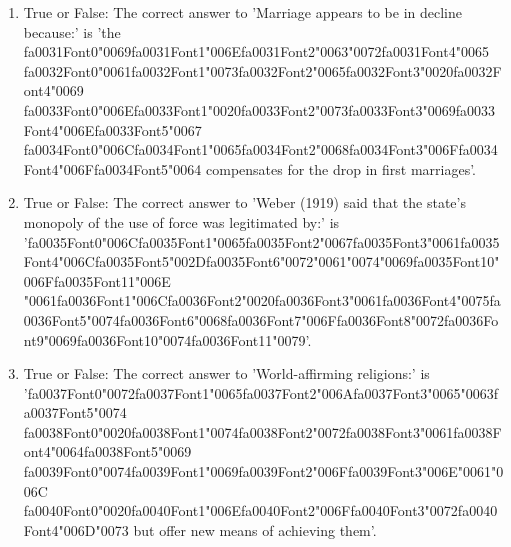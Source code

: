 \documentclass[12pt]{article}
\begin{document}
\begin{enumerate}[label=\arabic*.]
\item True or False: The correct answer to 'Marriage appears to be in decline because:' is 'the {\csname fa0031Font0\endcsname\char"0069}{\csname fa0031Font1\endcsname\char"006E}{\csname fa0031Font2\endcsname\char"0063}{\char"0072}{\csname fa0031Font4\endcsname\char"0065} {\csname fa0032Font0\endcsname\char"0061}{\csname fa0032Font1\endcsname\char"0073}{\csname fa0032Font2\endcsname\char"0065}{\csname fa0032Font3\endcsname\char"0020}{\csname fa0032Font4\endcsname\char"0069} {\csname fa0033Font0\endcsname\char"006E}{\csname fa0033Font1\endcsname\char"0020}{\csname fa0033Font2\endcsname\char"0073}{\csname fa0033Font3\endcsname\char"0069}{\csname fa0033Font4\endcsname\char"006E}{\csname fa0033Font5\endcsname\char"0067} {\csname fa0034Font0\endcsname\char"006C}{\csname fa0034Font1\endcsname\char"0065}{\csname fa0034Font2\endcsname\char"0068}{\csname fa0034Font3\endcsname\char"006F}{\csname fa0034Font4\endcsname\char"006F}{\csname fa0034Font5\endcsname\char"0064} compensates for the drop in first marriages'.
\item True or False: The correct answer to 'Weber (1919) said that the state's monopoly of the use of force was legitimated by:' is '{\csname fa0035Font0\endcsname\char"006C}{\csname fa0035Font1\endcsname\char"0065}{\csname fa0035Font2\endcsname\char"0067}{\csname fa0035Font3\endcsname\char"0061}{\csname fa0035Font4\endcsname\char"006C}{\csname fa0035Font5\endcsname\char"002D}{\csname fa0035Font6\endcsname\char"0072}{\char"0061}{\char"0074}{\char"0069}{\csname fa0035Font10\endcsname\char"006F}{\csname fa0035Font11\endcsname\char"006E} {\char"0061}{\csname fa0036Font1\endcsname\char"006C}{\csname fa0036Font2\endcsname\char"0020}{\csname fa0036Font3\endcsname\char"0061}{\csname fa0036Font4\endcsname\char"0075}{\csname fa0036Font5\endcsname\char"0074}{\csname fa0036Font6\endcsname\char"0068}{\csname fa0036Font7\endcsname\char"006F}{\csname fa0036Font8\endcsname\char"0072}{\csname fa0036Font9\endcsname\char"0069}{\csname fa0036Font10\endcsname\char"0074}{\csname fa0036Font11\endcsname\char"0079}'.
\item True or False: The correct answer to 'World-affirming religions:' is '{\csname fa0037Font0\endcsname\char"0072}{\csname fa0037Font1\endcsname\char"0065}{\csname fa0037Font2\endcsname\char"006A}{\csname fa0037Font3\endcsname\char"0065}{\char"0063}{\csname fa0037Font5\endcsname\char"0074} {\csname fa0038Font0\endcsname\char"0020}{\csname fa0038Font1\endcsname\char"0074}{\csname fa0038Font2\endcsname\char"0072}{\csname fa0038Font3\endcsname\char"0061}{\csname fa0038Font4\endcsname\char"0064}{\csname fa0038Font5\endcsname\char"0069} {\csname fa0039Font0\endcsname\char"0074}{\csname fa0039Font1\endcsname\char"0069}{\csname fa0039Font2\endcsname\char"006F}{\csname fa0039Font3\endcsname\char"006E}{\char"0061}{\char"006C} {\csname fa0040Font0\endcsname\char"0020}{\csname fa0040Font1\endcsname\char"006E}{\csname fa0040Font2\endcsname\char"006F}{\csname fa0040Font3\endcsname\char"0072}{\csname fa0040Font4\endcsname\char"006D}{\char"0073} but offer new means of achieving them'.

\end{enumerate}
\end{document}
